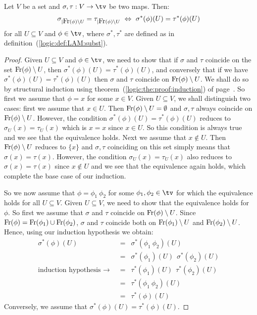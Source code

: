 \begin{prop}\label{logic:prop:LAM:freevar:beta:support}
    Let $V$ be a set and $\sigma,\tau:V\to\tv$ be two maps. Then:
        \[
            \sigma_{|\free(\phi)\setminus U}=\tau_{|\free(\phi)\setminus U}
            \ \Leftrightarrow\ \sigma^{*}(\phi)(U)=\tau^{*}(\phi)(U)
        \]
    for all $U\subseteq V$ and $\phi\in\tv$, where $\sigma^{*},\tau^{*}$ are 
    defined as in definition~(\ref{logic:def:LAM:subst}).
\end{prop}
\begin{proof}
    Given $U\subseteq V$ and $\phi\in\tv$, we need to show that if $\sigma$
    and $\tau$ coincide on the set $\mbox{\rm Fr}(\phi)\setminus U$, then 
    $\sigma^{*}(\phi)(U)=\tau^{*}(\phi)(U)$, and conversely that if 
    we have $\sigma^{*}(\phi)(U)=\tau^{*}(\phi)(U)$ then $\sigma$ and $\tau$ 
    coincide on $\mbox{\rm Fr}(\phi)\setminus U$. We shall do so by structural
    induction using theorem~(\ref{logic:the:proof:induction}) of
    page~\pageref{logic:the:proof:induction}. So first we assume that 
    $\phi=x$ for some $x\in V$. Given $U\subseteq V$, we shall distinguish 
    two cases: first we assume that $x\in U$. Then $\mbox{\rm Fr}(\phi)\setminus U=
    \emptyset$ and $\sigma, \tau$ always coincide on $\mbox{\rm Fr}(\phi)\setminus U$.
    However, the condition $\sigma^{*}(\phi)(U)=\tau^{*}(\phi)(U)$ reduces
    to $\sigma_{U}(x)=\tau_{U}(x)$ which is $x = x$ since $x\in U$. So this
    condition is always true and we see that the equivalence holds. Next
    we assume that $x\not\in U$. Then $\mbox{\rm Fr}(\phi)\setminus U$ reduces to 
    $\{x\}$ and $\sigma,\tau$ coinciding on this set simply means that 
    $\sigma(x) = \tau(x)$. However, the condition $\sigma_{U}(x)=\tau_{U}(x)$
    also reduces to $\sigma(x)=\tau(x)$ since $x\not\in U$ and we see that 
    the equivalence again holds, which complete the base case of our 
    induction.

    So we now assume that $\phi=\phi_{1}\ \phi_{2}$ for some 
    $\phi_{1},\phi_{2}\in\tv$ for which the equivalence holds for all
    $U\subseteq V$. Given $U\subseteq V$, we need to show that the 
    equivalence holds for $\phi$. So first we assume that $\sigma$ and
    $\tau$ coincide on $\mbox{\rm Fr}(\phi)\setminus U$. Since $\mbox{\rm Fr}(\phi)=
    \mbox{\rm Fr}(\phi_{1})\cup\mbox{\rm Fr}(\phi_{2})$, $\sigma$ and $\tau$ coincide
    both on $\mbox{\rm Fr}(\phi_{1})\setminus U$ and $\mbox{\rm Fr}(\phi_{2})\setminus U$.
    Hence, using our induction hypothesis we obtain:
        \begin{eqnarray*}\sigma^{*}(\phi)(U)
            &=&\sigma^{*}(\phi_{1}\ \phi_{2})(U)\\
            &=&\sigma^{*}(\phi_{1})(U)\ \ \sigma^{*}(\phi_{2})(U)\\
            \mbox{induction hypothesis\ $\rightarrow$\ }
            &=&\tau^{*}(\phi_{1})(U)\ \ \tau^{*}(\phi_{2})(U)\\
            &=&\tau^{*}(\phi_{1}\ \phi_{2})(U)\\
            &=&\tau^{*}(\phi)(U)
        \end{eqnarray*}
    Conversely, we assume that $\sigma^{*}(\phi)(U)=\tau^{*}(\phi)(U)$.
\end{proof}

